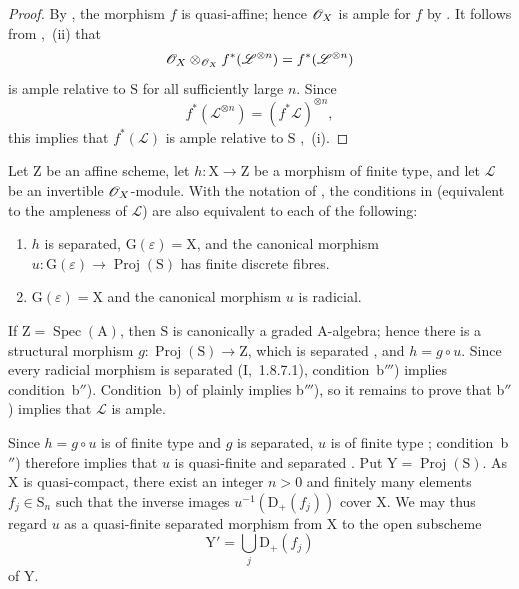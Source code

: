 \begin{proof}
By , the morphism $f$ is quasi-affine; hence $\mathscr{O}_X$ is ample for $f$ by . It follows from ,~(ii) that
\[
  \mathscr{O}_X\otimes_{\mathscr{O}_X}f^*(\mathscr{L}^{\otimes n})
  =f^*(\mathscr{L}^{\otimes n})
\]
is ample relative to $\mathrm{S}$ for all sufficiently large $n$. Since
\[
  f^*(\mathscr{L}^{\otimes n})=(f^*\mathscr{L})^{\otimes n},
\]
this implies that $f^*(\mathscr{L})$ is ample relative to $\mathrm{S}$ ,~(i).
\end{proof}

\begin{corollary}[18.12.17]
\label{IV.18.12.17}
Let $\mathrm{Z}$ be an affine scheme, let $h:\mathrm{X}\to\mathrm{Z}$ be a morphism of finite type, and let $\mathscr{L}$ be an invertible $\mathscr{O}_X$-module.
With the notation of , the conditions in  (equivalent to the ampleness of $\mathscr{L}$) are also equivalent to each of the following:

\begin{enumerate}
  \item[\rm b$''$)] $h$ is separated, $\mathrm{G}(\varepsilon)=\mathrm{X}$, and the canonical morphism $u:\mathrm{G}(\varepsilon)\to\operatorname{Proj}(\mathrm{S})$ has finite discrete fibres.
  \item[\rm b$'''$)] $\mathrm{G}(\varepsilon)=\mathrm{X}$ and the canonical morphism $u$ is radicial.
\end{enumerate}

If $\mathrm{Z}=\operatorname{Spec}(\mathrm{A})$, then $\mathrm{S}$ is canonically a graded $\mathrm{A}$-algebra; hence there is a structural morphism $g:\operatorname{Proj}(\mathrm{S})\to\mathrm{Z}$, which is separated , and $h=g\circ u$. Since every radicial morphism is separated (I,~1.8.7.1), condition~b$'''$) implies condition~b$''$). Condition~b) of  plainly implies b$'''$), so it remains to prove that b$''$) implies that $\mathscr{L}$ is ample.

Since $h=g\circ u$ is of finite type and $g$ is separated, $u$ is of finite type ; condition~b$''$) therefore implies that $u$ is quasi-finite and separated . Put $\mathrm{Y}=\operatorname{Proj}(\mathrm{S})$. As $\mathrm{X}$ is quasi-compact, there exist an integer $n>0$ and finitely many elements $f_j\in\mathrm{S}_n$ such that the inverse images $u^{-1}(\mathrm{D}_+(f_j))$ cover $\mathrm{X}$. We may thus regard $u$ as a quasi-finite separated morphism from $\mathrm{X}$ to the open subscheme
\[
  \mathrm{Y}'=\bigcup_j\mathrm{D}_+(f_j)
\]
of $\mathrm{Y}$.


\end{corollary}
